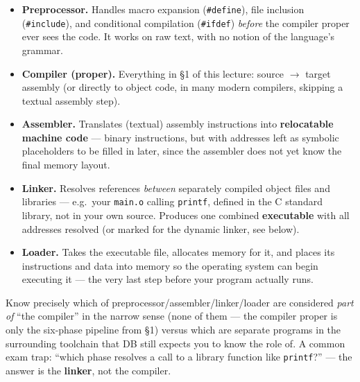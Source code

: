 \documentclass[11pt]{article}
\begin{document}
\begin{itemize}
  \item \textbf{Preprocessor.} Handles macro expansion (\texttt{\#define}), file inclusion
  (\texttt{\#include}), and conditional compilation (\texttt{\#ifdef}) \emph{before} the
  compiler proper ever sees the code. It works on raw text, with no notion of the language's
  grammar.
  \item \textbf{Compiler (proper).} Everything in \S1 of this lecture: source $\to$ target
  assembly (or directly to object code, in many modern compilers, skipping a textual assembly
  step).
  \item \textbf{Assembler.} Translates (textual) assembly instructions into \textbf{relocatable
  machine code} --- binary instructions, but with addresses left as symbolic placeholders to be
  filled in later, since the assembler does not yet know the final memory layout.
  \item \textbf{Linker.} Resolves references \emph{between} separately compiled object files and
  libraries --- e.g.\ your \texttt{main.o} calling \texttt{printf}, defined in the C standard
  library, not in your own source. Produces one combined \textbf{executable} with all addresses
  resolved (or marked for the dynamic linker, see below).
  \item \textbf{Loader.} Takes the executable file, allocates memory for it, and places its
  instructions and data into memory so the operating system can begin executing it --- the very
  last step before your program actually runs.
\end{itemize}

\begin{examfocus}
Know precisely which of preprocessor/assembler/linker/loader are considered \emph{part of} ``the
compiler'' in the narrow sense (none of them --- the compiler proper is only the six-phase
pipeline from \S1) versus which are separate programs in the surrounding toolchain that DB
still expects you to know the role of. A common exam trap: ``which phase resolves a call to a
library function like \texttt{printf}?'' --- the answer is the \textbf{linker}, not the compiler.
\end{examfocus}
\end{document}
